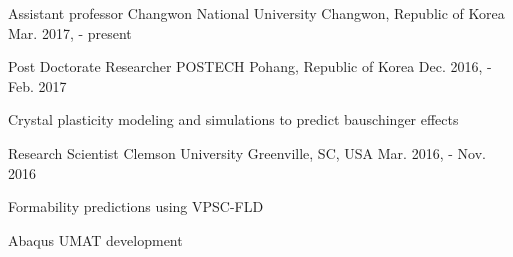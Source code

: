 

\begin{cventries}
  \cventry
  {Assistant professor} %
  {Changwon National University}
  {Changwon, Republic of Korea} %
  {Mar. 2017, - present} %
  {
  }

  \cventry
  {Post Doctorate Researcher} %
  {POSTECH}
  {Pohang, Republic of Korea} %
  {Dec. 2016, - Feb. 2017} %
  {
    \begin{cvitems} %
    \item {Crystal plasticity modeling and simulations to predict bauschinger effects}
    \end{cvitems}
  }

  \cventry
  {Research Scientist} %
  {Clemson University}
  {Greenville, SC, USA} %
  {Mar. 2016, - Nov. 2016} %
  {
    \begin{cvitems} %
    \item {Formability predictions using VPSC-FLD}
    \item {Abaqus UMAT development}
    \end{cvitems}
  }


\end{cventries}

